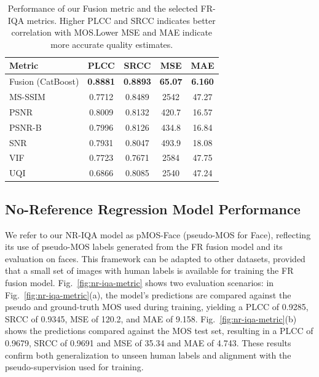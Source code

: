 \begin{table}
\centering
\caption{Performance of our Fusion metric and the selected FR-IQA metrics. Higher PLCC and SRCC indicates better correlation with MOS.\@ Lower MSE and MAE indicate more accurate quality estimates.}\label{tab:fr_model_score}
\begin{tabular}{lcccc}
\toprule
\textbf{Metric} & \textbf{PLCC} & \textbf{SRCC} & \textbf{MSE} & \textbf{MAE} \\
\midrule
Fusion (CatBoost) & \textbf{0.8881} & \textbf{0.8893} & \textbf{65.07} & \textbf{6.160} \\
MS-SSIM & 0.7712 & 0.8489 & 2542 & 47.27 \\
PSNR & 0.8009 & 0.8132 & 420.7 & 16.57 \\
PSNR-B & 0.7996 & 0.8126 & 434.8 & 16.84 \\
SNR & 0.7931 & 0.8047 & 493.9 & 18.08 \\
VIF & 0.7723 & 0.7671 & 2584 & 47.75 \\
UQI & 0.6866 & 0.8085 & 2540 & 47.24 \\
\bottomrule
\end{tabular}
\end{table}

\subsection{No-Reference Regression Model Performance}

We refer to our NR-IQA model as pMOS-Face (pseudo-MOS for Face), reflecting its use of pseudo-MOS labels generated from the FR fusion model and its evaluation on faces. This framework can be adapted to other datasets, provided that a small set of images with human labels is available for training the FR fusion model. Fig.~\ref{fig:nr-iqa-metric} shows two evaluation scenarios: in Fig.~\ref{fig:nr-iqa-metric}(a), the model's predictions are compared against the pseudo and ground-truth MOS used during training, yielding a PLCC of 0.9285, SRCC of 0.9345, MSE of 120.2, and MAE of 9.158. Fig.~\ref{fig:nr-iqa-metric}(b) shows the predictions compared against the MOS test set, resulting in a PLCC of 0.9679, SRCC of 0.9691 and MSE of 35.34 and MAE of 4.743. These results confirm both generalization to unseen human labels and alignment with the pseudo-supervision used for training. %

